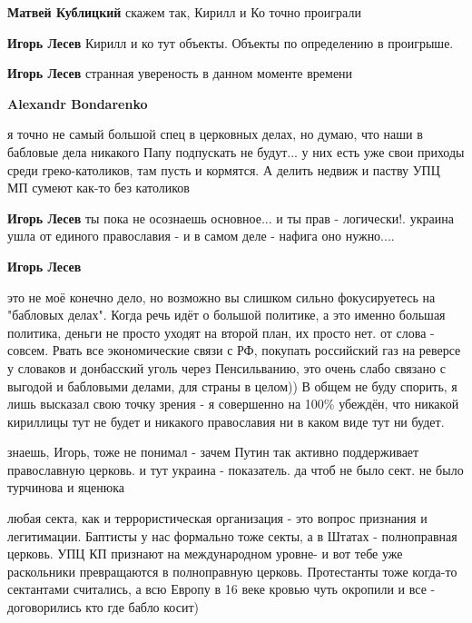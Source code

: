 \begin{itemize}
\begin{itemize}
\textbf{Матвей Кублицкий} скажем так, Кирилл и Ко точно проиграли

\textbf{Игорь Лесев} Кирилл и ко тут объекты. Объекты по определению в проигрыше.

\textbf{Игорь Лесев} странная увереность в данном моменте времени

\textbf{Alexandr Bondarenko} 

я точно не самый большой спец в церковных делах, но думаю, что наши в бабловые
дела никакого Папу подпускать не будут... у них есть уже свои приходы среди
греко-католиков, там пусть и кормятся. А делить недвиж и паству УПЦ МП сумеют
как-то без католиков

\textbf{Игорь Лесев} ты пока не осознаешь основное... и ты прав - логически!. украина ушла от единого православия - и в самом деле - нафига оно нужно....

\textbf{Игорь Лесев} 

это не моё конечно дело, но возможно вы слишком сильно фокусируетесь на
"бабловых делах". Когда речь идёт о большой политике, а это именно большая
политика, деньги не просто уходят на второй план, их просто нет. от слова -
совсем. Рвать все экономические связи с РФ, покупать российский газ на реверсе
у словаков и донбасский уголь через Пенсильванию, это очень слабо связано с
выгодой и бабловыми делами, для страны в целом)) В общем не буду спорить, я
лишь высказал свою точку зрения - я совершенно на 100\% убеждён, что никакой
кириллицы тут не будет и никакого православия ни в каком виде тут ни будет.

\end{itemize} %


знаешь, Игорь, тоже не понимал - зачем Путин так активно поддерживает
православную церковь. и тут украина - показатель. да чтоб не было сект. не было
турчинова и яценюка

\begin{itemize} %

любая секта, как и террористическая организация - это вопрос признания и
легитимации. Баптисты у нас формально тоже секты, а в Штатах - полноправная
церковь. УПЦ КП признают на международном уровне- и вот тебе уже раскольники
превращаются в полноправную церковь. Протестанты тоже когда-то сектантами
считались, а всю Европу в 16 веке кровью чуть окропили и все - договорились кто
где бабло косит)


\end{itemize}
\end{itemize}
